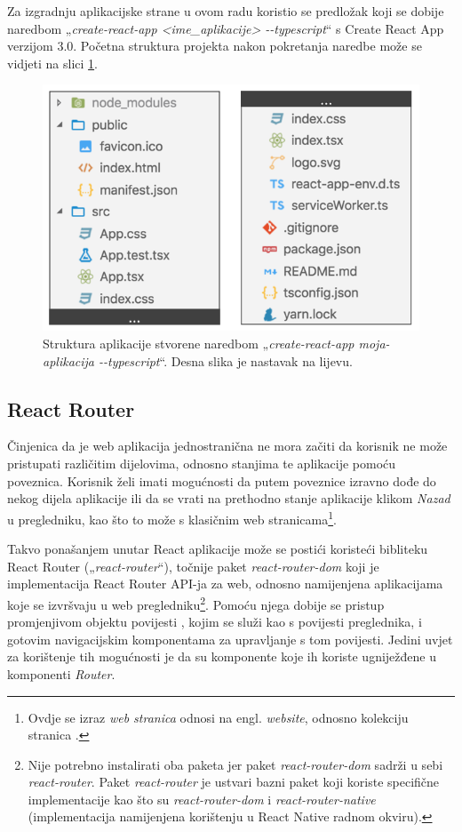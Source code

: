 \documentclass[times, utf8, diplomski, numeric]{fer}
\newcommand{\razmakp}{\vspace{18pt}}
\newcommand{\razmaks}{\vspace{10pt}}
\begin{document}
\razmakp

Za izgradnju aplikacijske strane u ovom radu koristio se predložak koji se dobije naredbom „\emph{create-react-app <ime\_aplikacije> -{}-typescript}“ s Create React App verzijom 3.0.
Početna struktura projekta nakon pokretanja naredbe može se vidjeti na slici \ref{fig:cra}.

\begin{figure}[!htb] %
    \centering
    \includegraphics[width=12cm]{images/cra.png}
    \caption{Struktura aplikacije stvorene naredbom „\emph{create-react-app moja-aplikacija -{}-typescript}“. Desna slika je nastavak na lijevu.}
    \label{fig:cra}
    \razmaks
\end{figure}


\razmaks
\subsection{React Router}

Činjenica da je web aplikacija jednostranična ne mora začiti da korisnik ne može pristupati različitim dijelovima, odnosno stanjima te aplikacije pomoću poveznica.
Korisnik želi imati mogućnosti da putem poveznice izravno dođe do nekog dijela aplikacije ili da se vrati na prethodno stanje aplikacije klikom \emph{Nazad} u pregledniku, kao što to može s klasičnim web stranicama\footnote{Ovdje se izraz \emph{web stranica} odnosi na engl. \emph{website}, odnosno kolekciju stranica .}.

Takvo ponašanjem unutar React aplikacije može se postići koristeći bibliteku React Router („\emph{react-router}“), točnije paket \emph{react-router-dom} koji je implementacija React Router API-ja za web, odnosno namijenjena aplikacijama koje se izvršvaju u web pregledniku\footnote{
    Nije potrebno instalirati oba paketa jer paket \emph{react-router-dom} sadrži u sebi \emph{react-router}.
    Paket \emph{react-router} je ustvari bazni paket koji koriste specifične implementacije kao što su \emph{react-router-dom} i \emph{react-router-native} (implementacija namijenjena korištenju u React Native radnom okviru).
}.
Pomoću njega dobije se pristup promjenjivom objektu povijesti , kojim se služi kao s povijesti preglednika, i gotovim navigacijskim komponentama za upravljanje s tom povijesti.
Jedini uvjet za korištenje tih mogućnosti je da su komponente koje ih koriste ugniježđene u komponenti \emph{Router}\citep{react_router}.
\end{document}
